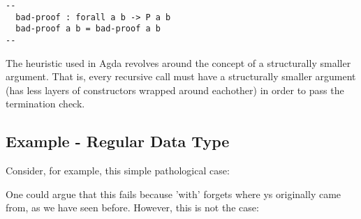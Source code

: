 \documentclass[12pt,twoside,notitlepage]{report}
\newcommand{\Conid}[1]{\mathit{#1}}
\newcommand{\Varid}[1]{\mathit{#1}}
\def\resethooks{%
  \global\let\SaveRestoreHook\empty
  \global\let\ColumnHook\empty}
\let\hspre\empty
\let\hspost\empty
\begin{document}
\begin{verbatim}
--
  bad-proof : forall a b -> P a b
  bad-proof a b = bad-proof a b
--
\end{verbatim}

The heuristic used in Agda revolves around the concept of a structurally smaller argument. That is, every recursive call must have a structurally smaller argument (has less layers of constructors wrapped around eachother) in order to pass the termination check.



\subsection{Example - Regular Data Type} 
Consider, for example, this simple pathological case:

\resethooks

One could argue that this fails because 'with' forgets where ys originally came from, as we have seen before. However, this is not the case: 
\end{document}
